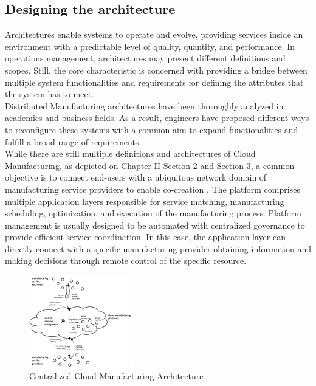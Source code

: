 \subsection{Designing the architecture}
Architectures enable systems to operate and evolve, providing services inside an environment with a predictable level of quality, quantity, and performance. In operations management, architectures may present different definitions and scopes. Still, the core characteristic is concerned with providing a bridge between multiple system functionalities and requirements for defining the attributes that the system has to meet.\\
Distributed Manufacturing architectures have been thoroughly analyzed in academics and business fields. As a result, engineers have proposed different ways to reconfigure these systems with a common aim to expand functionalities and fulfill a broad range of requirements.\\
While there are still multiple definitions and architectures of Cloud Manufacturing, as depicted on Chapter II Section 2 and Section 3, a common objective is to connect end-users with a ubiquitous network domain of manufacturing service providers to enable co-creation \parencite{goran_advanced_2012}. The platform comprises multiple application layers responsible for service matching, manufacturing scheduling, optimization, and execution of the manufacturing process. Platform management is usually designed to be automated with centralized governance to provide efficient service coordination. In this case, the application layer can directly connect with a specific manufacturing provider obtaining information and making decisions through remote control of the specific resource.
\begin{figure}
    \centering
    \includegraphics[height=4cm, keepaspectratio]{images/centralized-cmfg-architecture}
    \caption{Centralized Cloud Manufacturing Architecture}
    \label{fig:centralized-cmfg-architecture}
\end{figure}

